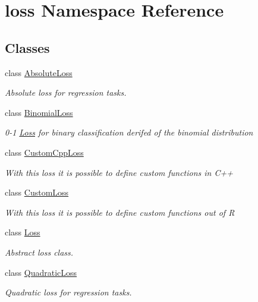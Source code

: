 \hypertarget{namespaceloss}{}\section{loss Namespace Reference}
\label{namespaceloss}
\subsection*{Classes}
\begin{DoxyCompactItemize}
\item 
class \hyperlink{classloss_1_1_absolute_loss}{Absolute\+Loss}
\begin{DoxyCompactList}\small\item\em Absolute loss for regression tasks. \end{DoxyCompactList}\item 
class \hyperlink{classloss_1_1_binomial_loss}{Binomial\+Loss}
\begin{DoxyCompactList}\small\item\em 0-\/1 \hyperlink{classloss_1_1_loss}{Loss} for binary classification derifed of the binomial distribution \end{DoxyCompactList}\item 
class \hyperlink{classloss_1_1_custom_cpp_loss}{Custom\+Cpp\+Loss}
\begin{DoxyCompactList}\small\item\em With this loss it is possible to define custom functions in {\ttfamily C++} \end{DoxyCompactList}\item 
class \hyperlink{classloss_1_1_custom_loss}{Custom\+Loss}
\begin{DoxyCompactList}\small\item\em With this loss it is possible to define custom functions out of {\ttfamily R} \end{DoxyCompactList}\item 
class \hyperlink{classloss_1_1_loss}{Loss}
\begin{DoxyCompactList}\small\item\em Abstract loss class. \end{DoxyCompactList}\item 
class \hyperlink{classloss_1_1_quadratic_loss}{Quadratic\+Loss}
\begin{DoxyCompactList}\small\item\em Quadratic loss for regression tasks. \end{DoxyCompactList}\end{DoxyCompactItemize}
